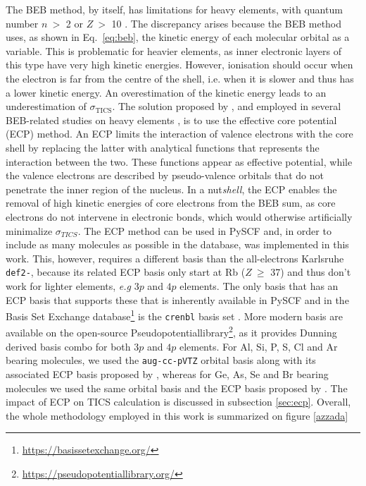 \documentclass[twocolumn, a4paper, twoside,10pt]{scrartcl}
\begin{document}
The BEB method, by itself, has limitations for heavy elements, with quantum number $n~>$ 2 or $Z~>$ 10 \citep{gravesEfficientCalculationElectron2021,huoUseRelativisticEffective2000,aliIonizationCrossSections2008,scottElectronImpactIonizationCross2005}. The discrepancy arises because the BEB method uses, as shown in Eq.~\ref{eq:beb}, the kinetic energy of each molecular orbital as a variable. This is problematic for heavier elements, as inner electronic layers of this type have very high kinetic energies. However, ionisation should occur when the electron is far from the centre of the shell, i.e. when it is slower and thus has a lower kinetic energy. An overestimation of the kinetic energy leads to an underestimation of $\sigma_{\text{TICS}}$. The solution proposed by \citet{huoUseRelativisticEffective2000}, and employed in several BEB-related studies on heavy elements \citep{gravesEfficientCalculationElectron2021,dolgRelativisticPseudopotentialsTheir2012,scottElectronImpactIonizationCross2005}, is to use the effective core potential (ECP) method. An ECP limits the interaction of valence electrons with the core shell by replacing the latter with analytical functions that represents the interaction between the two. These functions appear as effective potential, while the valence electrons are described by pseudo-valence orbitals that do not penetrate the inner region of the nucleus. In a nut\textit{shell}, the ECP enables the removal of high kinetic energies of core electrons from the BEB sum, as core electrons do not intervene in electronic bonds, which would otherwise artificially minimalize $\sigma_{TICS}$.
The ECP method can be used in PySCF and, in order to include as many molecules as possible in the database, was implemented in this work. This, however, requires a different basis than the all-electrons Karlsruhe \verb+def2-+, because its related ECP basis only start at Rb ($Z~\geq$ 37) and thus don't work for lighter elements, \textit{e.g} $3p$ and $4p$ elements. The only basis that has an ECP basis that supports  these that is inherently available in PySCF and in the Basis Set Exchange database\footnote{\url{https://basissetexchange.org/}} \citep{pritchardNewBasisSet2019} is the \verb|crenbl| basis set \citep{hurleyInitioRelativisticEffective1986,fernandezpaciosInitioRelativisticEffective1985}. More modern basis are available on the open-source Pseudopotentiallibrary\footnote{\url{https://pseudopotentiallibrary.org/}}, as it provides Dunning derived basis combo for both $3p$ and $4p$ elements.  For Al, Si, P, S, Cl and Ar bearing molecules, we used the \verb|aug-cc-pVTZ| orbital basis along with its associated ECP basis proposed by \citep{bennettNewGenerationEffective2018}, whereas for Ge, As, Se and Br bearing molecules we used the same orbital basis and the ECP basis proposed by \citep{wangNewGenerationEffective2019}. The impact of ECP on TICS calculation is discussed in subsection \ref{sec:ecp}. Overall, the whole methodology employed in this work is summarized on figure \ref{azzada}
\end{document}
